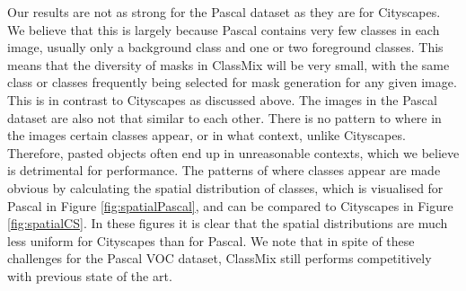 \documentclass[10pt,twocolumn,letterpaper]{article}
\begin{document}
Our results are not as strong for the Pascal dataset as they are for Cityscapes. We believe that this is largely because Pascal contains very few classes in each image, usually only a background class and one or two foreground classes. This means that the diversity of masks in ClassMix will be very small, with the same class or classes frequently being selected for mask generation for any given image. This is in contrast to Cityscapes as discussed above. The images in the Pascal dataset are also not that similar to each other. There is no pattern to where in the images certain classes appear, or in what context, unlike Cityscapes. Therefore, pasted objects often end up in unreasonable contexts, which we believe is detrimental for performance. The patterns of where classes appear are made obvious by calculating the spatial distribution of classes, which is visualised for Pascal in Figure \ref{fig:spatialPascal}, and can be compared to Cityscapes in Figure \ref{fig:spatialCS}. In these figures it is clear that the spatial distributions are much less uniform for Cityscapes than for Pascal. We note that in spite of these challenges for the Pascal VOC dataset, ClassMix still performs competitively with previous state of the art.
\end{document}
